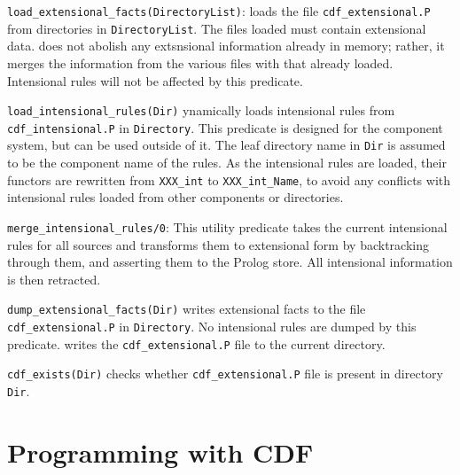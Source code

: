\begin{description}	
{\tt load\_extensional\_facts(DirectoryList)}: loads the file
{\tt cdf\_extensional.P} from directories in {\tt DirectoryList}.  The
files loaded must contain extensional data.
 does not abolish any extsnsional
information already in memory; rather, it merges the information from
the various files with that already loaded.  Intensional rules will
not be affected by this predicate.  

{\tt load\_intensional\_rules(Dir)} ynamically loads intensional rules
from {\tt cdf\_intensional.P} in {\tt Directory}.  This predicate is
designed for the component system, but can be used outside of it.  The
leaf directory name in {\tt Dir} is assumed to be the component name
of the rules.  As the intensional rules are loaded, their functors are
rewritten from {\tt XXX\_int} to {\tt XXX\_int\_Name}, to avoid any
conflicts with intensional rules loaded from other components or
directories.

{\tt merge\_intensional\_rules/0}: This utility predicate takes the
current intensional rules for all sources and transforms them to
extensional form by backtracking through them, and asserting them to
the Prolog store.  All intensional information is then retracted.

{\tt dump\_extensional\_facts(Dir)} writes extensional facts to the
file {\tt cdf\_extensional.P} in {\tt Directory}.  No intensional
rules are dumped by this predicate.
 writes the {\tt cdf\_extensional.P} file
to the current directory. 


{\tt cdf\_exists(Dir)} checks whether {\tt cdf\_extensional.P} file is
present in directory {\tt Dir}.

\end{description}

%
%


\section{Programming with CDF}

